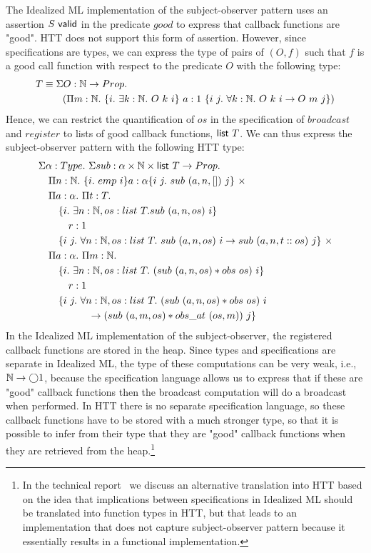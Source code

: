 The Idealized ML implementation of the subject-observer pattern uses an
assertion $S\mbox{\textsf{{ valid}}}$ in the predicate $good$ to express that callback functions
are "good". HTT does not support this form of assertion. However, since
specifications are types, we can express the type of pairs of $(O, f)$ such
that $f$ is a good call function with respect to the predicate $O$ with the
following type: 
{\small\begin{align*}
T &\equiv \Sigma O : \N \rightarrow \HPROP.\\
&\quad\quad (\Pi m : \N.\ \{ i.\ \exists k : \N.\ O\ k\ i\}\ a : 1\ \{ i\ j.\ \forall k : \N.\ O\ k\ i \rightarrow O\ m\ j \})
\end{align*}}
Hence, we can restrict the quantification of $os$ in the specification of
$broadcast$ and $register$ to lists of good callback functions, $\mbox{\textsf{{list }}}{T}$.
We can thus express the subject-observer pattern with the following HTT type:
{\small
\begin{align*}
&\Sigma \alpha : \TYPE.\ \Sigma sub : \alpha \times \N \times \listtype T
\rightarrow \HPROP.\\
&\quad \Pi n : \N.\ \{ i.\ emp\ i \} a : \alpha \{ i\ j.\ sub\ (a, n, [])\ j \}\ \times\\
&\quad \Pi a : \alpha.\ \Pi t : T.\\
&\quad\quad\{ i.\ \exists n : \N, os : list\ T. sub\ (a, n, os)\ i \}\\
&\quad\quad\quad r : 1\\
&\quad\quad \{ i\ j.\ \forall n : \N, os : list\ T.\ sub\ (a, n, os)\ i \rightarrow sub\ (a, n, t::os)\ j
\}\ \times\\
&\quad \Pi a : \alpha.\ \Pi m : \N.\\
&\quad\quad\{ i.\ \exists n : \N, os : list\ T.\ (sub\ (a, n, os) * obs\ os)\ i \}\\
&\quad\quad\quad r : 1\\
&\quad\quad \{ i\ j.\ \forall n : \N, os : list\ T.\ (sub\ (a, n, os) * obs\ os)\ i\\
&\quad\quad\quad\quad\quad \rightarrow (sub\ (a, m, os) * obs\_at\ (os, m))\ j \}
\end{align*}} In the Idealized ML implementation of the subject-observer,
the registered callback functions are stored in the heap. Since types and
specifications are separate in Idealized ML, the type of these computations
can be very weak, i.e., $\mathbb{N} \rightarrow \bigcirc{1}$, because the
specification language allows us to express that if these are "good"
callback functions then the broadcast computation will do a broadcast when
performed. In HTT there is no separate specification language, so these
callback functions have to be stored with a much stronger type, so that it
is possible to infer from their type that they are "good" callback
functions when they are retrieved from the heap.\footnote{In the technical
  report~\cite{svendsen08} we discuss an alternative translation into HTT
  based on the idea that implications between specifications in Idealized
  ML should be translated into function types in HTT, but that leads to
  an implementation that does not capture subject-observer pattern because
  it essentially results in a functional implementation.}

